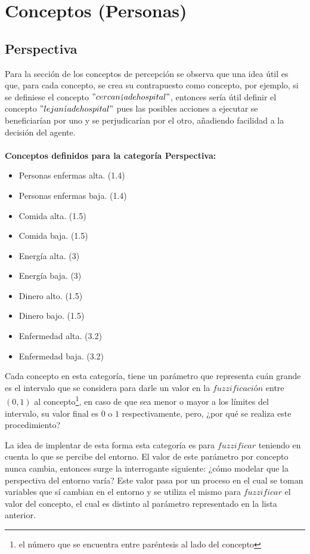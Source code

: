 \section{Conceptos (Personas)}
\subsection{Perspectiva}
Para la sección de los conceptos de percepción se observa que una idea útil es que, para cada concepto, se crea su contrapuesto
como concepto, por ejemplo, si se definiese el concepto $"cercan$í$a de hospital"$, entonces sería útil definir el concepto
$"lejan$í$a de hospital"$ pues las posibles acciones a ejecutar se beneficiarían por uno y se perjudicarían por el otro,
añadiendo facilidad a la decisión del agente.\\
\\
\textbf{Conceptos definidos para la categoría Perspectiva:}
\begin{itemize}
    \item Personas enfermas alta. (1.4)
    \item Personas enfermas baja. (1.4)
    \item Comida alta. (1.5)
    \item Comida baja. (1.5)
    \item Energía alta. (3)
    \item Energía baja. (3)
    \item Dinero alto. (1.5)
    \item Dinero bajo. (1.5)
    \item Enfermedad alta. (3.2)
    \item Enfermedad baja. (3.2)
\end{itemize}

Cada concepto en esta categoría, tiene un parámetro que representa cuán grande es el intervalo que se considera para darle un valor en la 
$fuzzificaci$ó$n$ entre $(0,1)$ al concepto\footnote{el número que se encuentra entre paréntesis al lado del concepto}, en caso 
de que sea menor o mayor a los límites del intervalo, su valor final es $0$ o $1$ respectivamente, pero, ¿por qué
se realiza este procedimiento?

La idea de implentar de esta forma esta categoría es para $fuzzificar$ teniendo en cuenta lo que se percibe 
del entorno. El valor de este parámetro por concepto nunca cambia, entonces surge la interrogante siguiente: 
¿cómo modelar que la perspectiva del entorno varía? Este valor pasa por un proceso en el cual se toman variables que sí
cambian en el entorno y se utiliza el mismo para $fuzzificar$ el valor del concepto, el cual es distinto al parámetro 
representado en la lista anterior.

